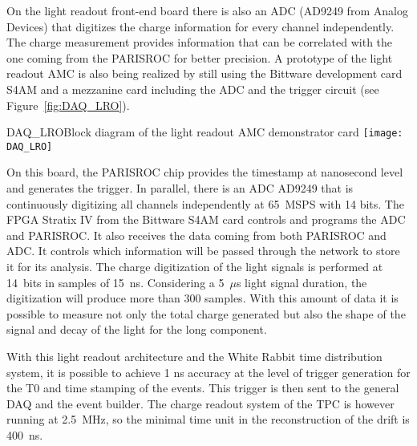 On the light readout front-end board there is also an ADC (AD9249 from
Analog Devices) that digitizes the charge information for every
channel independently. The charge measurement provides information
that can be correlated with the one coming from the PARISROC for
better precision. A prototype of the light readout AMC is also being
realized by still using the Bittware development card S4AM and a
mezzanine card including the ADC and the trigger circuit (see
Figure~\ref{fig:DAQ_LRO}).
\begin{cdrfigure}{DAQ_LRO}{Block diagram of the light readout AMC demonstrator card}
 \texttt{[image: DAQ\_LRO]}  
\end{cdrfigure}

On this board, the PARISROC chip provides the timestamp at nanosecond
level and generates the trigger. In parallel, there is an ADC AD9249
that is continuously digitizing all channels independently at 65~MSPS
with 14 bits. The FPGA Stratix IV from the Bittware S4AM card controls
and programs the ADC and PARISROC. It also receives the data coming
from both PARISROC and ADC. It controls which information will be
passed through the network to store it for its analysis.  The charge
digitization of the light signals is performed at 14~bits in samples
of 15~ns. Considering a 5~$\mu$s light signal duration, the
digitization will produce more than 300 samples. With this amount of
data it is possible to measure not only the total charge generated but
also the shape of the signal and decay of the light for the long
component.


With this light readout architecture and the White Rabbit time
distribution system, it is possible to achieve 1 ns accuracy at the
level of trigger generation for the T0 and time stamping of the
events. This trigger is then sent to the general DAQ and the event
builder. The charge readout system of the TPC is however running at
2.5~MHz, so the minimal time unit in the reconstruction of the drift
is 400~ns.
